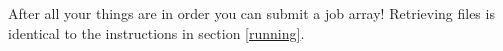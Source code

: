 \documentclass{article}
\newcommand{\edge}{\texttt{EDGE }}
\begin{document}
After all your things are in order you can submit a job array! Retrieving files is identical to the instructions in section \ref{running}.

















\end{document}
